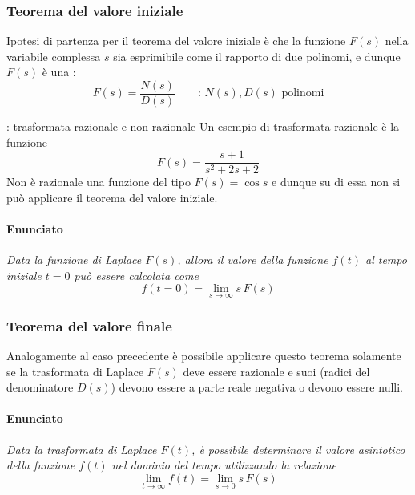 		\subsubsection{Teorema del valore iniziale}
		Ipotesi di partenza per il teorema del valore iniziale è che la funzione $F(s)$ nella variabile complessa $s$ sia esprimibile come il rapporto di due polinomi, e dunque $F(s)$ è una :
		\begin{equation}
			F(s) = \frac{N(s)}{D(s)} \qquad \textrm{: $N(s),D(s)$ polinomi}
		\end{equation}
		\begin{esempio}{: trasformata razionale e non razionale}
			Un esempio di trasformata razionale è la funzione
			\[F(s) = \frac{s+1}{s^2+2s + 2}\]
			Non è razionale una funzione del tipo $F(s)=\cos s $ e dunque su di essa non si può applicare il teorema del valore iniziale.
		\end{esempio}
	
		\paragraph{Enunciato} {\itshape Data la funzione di Laplace $F(s)$, allora il valore della funzione $f(t)$ al tempo iniziale $t = 0$ può essere calcolata come}
		\begin{equation}
			f(t=0) = \lim_{s\rightarrow \infty} s\, F(s)
		\end{equation}
		
		\subsubsection{Teorema del valore finale}
		Analogamente al caso precedente è possibile applicare questo teorema solamente se la trasformata di Laplace $F(s)$ deve essere razionale e suoi  (radici del denominatore $D(s)$) devono essere a parte reale negativa o devono essere nulli.
		
		\paragraph{Enunciato} { \itshape Data la trasformata di Laplace $F(t)$, è possibile determinare il valore asintotico della funzione $f(t)$ nel dominio del tempo utilizzando la relazione}
		\begin{equation}
			\lim_{t\rightarrow \infty} f(t) = \lim_{s\rightarrow 0} s\, F(s)
		\end{equation} 
	
